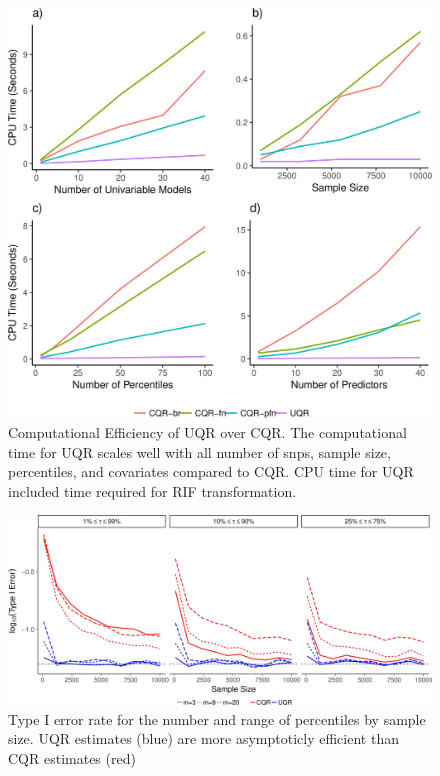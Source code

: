 \documentclass[12pt]{article}
\begin{document}
\begin{appendices}
\newpage
\begin{figure}[!h]
	\centering
	\includegraphics[width=1\textwidth, height=0.8\textwidth]{Figures/CQRvsUQR_Speed.jpg}
	\caption{Computational Efficiency of UQR over CQR. The computational time for UQR scales well with all number of snps, sample size, percentiles, and covariates compared to CQR. CPU time for UQR included time required for RIF transformation.}
	\label{fig:CompEff}
\end{figure}

\newpage
\begin{landscape}
	\begin{figure}%
		\centering
		\includegraphics[width=1\textwidth, height=0.5\textwidth]{Figures/ConvergenceDiag_Rate.jpg}
		\caption{Type I error rate for the number and range of percentiles by sample size. UQR estimates (blue) are more asymptoticly efficient than CQR estimates (red)} 
		\label{fig:FS1}
	\end{figure}
\end{landscape}
%


\end{appendices}
\end{document}
